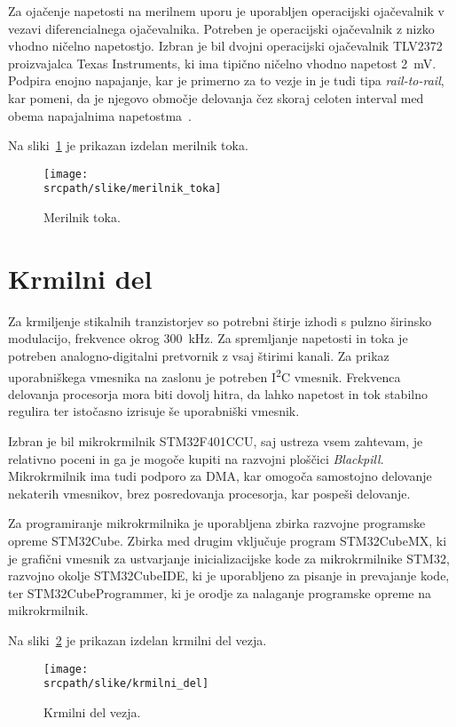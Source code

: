 \documentclass[a4paper,twoside,openright,12pt,slovene]{book}
\newcommand{\srcpath}{res_dark}
\newcommand{\srcpath}{res}
\begin{document}
Za ojačenje napetosti na merilnem uporu je uporabljen operacijski ojačevalnik v vezavi diferencialnega ojačevalnika.
Potreben je operacijski ojačevalnik z nizko vhodno ničelno napetostjo.
Izbran je bil dvojni operacijski ojačevalnik TLV2372 proizvajalca Texas Instruments, ki ima tipično ničelno vhodno napetost 2~mV.\@
Podpira enojno napajanje, kar je primerno za to vezje in je tudi tipa \textit{rail-to-rail}, kar pomeni,
da je njegovo območje delovanja čez skoraj celoten interval med obema napajalnima napetostma~\cite{texas_instruments_inc_tlv2372_nodate}.

Na sliki~\ref{fig:merilnik_toka_slika} je prikazan izdelan merilnik toka.
\begin{figure}[H]
    \centering
    \texttt{[image: \\srcpath/slike/merilnik\_toka]}
    \caption{\label{fig:merilnik_toka_slika} Merilnik toka.}
\end{figure}

\section{Krmilni del} \label{sec:krmilni_del}
Za krmiljenje stikalnih tranzistorjev so potrebni štirje izhodi s pulzno širinsko modulacijo, frekvence okrog 300~kHz.
Za spremljanje napetosti in toka je potreben analogno-digitalni pretvornik z vsaj štirimi kanali.
Za prikaz uporabniškega vmesnika na zaslonu je potreben I\textsuperscript{2}C vmesnik.
Frekvenca delovanja procesorja mora biti dovolj hitra, da lahko napetost in tok stabilno regulira ter istočasno izrisuje še uporabniški vmesnik.

Izbran je bil mikrokrmilnik STM32F401CCU, saj ustreza vsem zahtevam, je relativno poceni in ga je mogoče kupiti na razvojni ploščici \textit{Blackpill}.
Mikrokrmilnik ima tudi podporo za DMA, kar omogoča samostojno delovanje nekaterih vmesnikov, brez posredovanja procesorja, kar pospeši delovanje.

Za programiranje mikrokrmilnika je uporabljena zbirka razvojne programske opreme STM32Cube.
Zbirka med drugim vključuje program STM32CubeMX, ki je grafični vmesnik za ustvarjanje inicializacijske kode za mikrokrmilnike STM32,
razvojno okolje STM32CubeIDE, ki je uporabljeno za pisanje in prevajanje kode,
ter STM32CubeProgrammer, ki je orodje za nalaganje programske opreme na mikrokrmilnik.

Na sliki~\ref{fig:krmilni-del-slika} je prikazan izdelan krmilni del vezja.
\begin{figure}[H]
    \centering
    \texttt{[image: \\srcpath/slike/krmilni\_del]}
    \caption{\label{fig:krmilni-del-slika} Krmilni del vezja.}
\end{figure}
\end{document}
